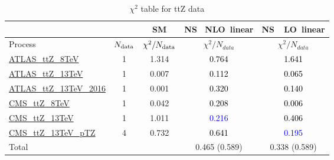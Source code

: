 \documentclass{article}
\begin{document}
\begin{table}[H]
\centering
\begin{tabular}{|l|c|c|c|c|}
\hline
 \multicolumn{2}{|c|}{} & SM& \rm NS \ NLO\ linear& \rm NS\ \ LO\ linear\\ \hline
Process & $N_{\rm data}$ & $\chi^ 2/N_{\rm data}$& $\chi^ 2/N_{data}$& $\chi^ 2/N_{data}$\\ \hline
\href{https://arxiv.org/abs/1509.05276}{ATLAS_ttZ_8TeV} & 1 & 1.314 & \textcolor{black}                            {0.764} & \textcolor{black}                            {1.641} \\ \hline
\href{https://arxiv.org/abs/1609.01599}{ATLAS_ttZ_13TeV} & 1 & 0.007 & \textcolor{black}                            {0.112} & \textcolor{black}                            {0.065} \\ \hline
\href{https://arxiv.org/abs/1901.03584}{ATLAS_ttZ_13TeV_2016} & 1 & 0.001 & \textcolor{black}                            {0.320} & \textcolor{black}                            {0.140} \\ \hline
\href{https://arxiv.org/abs/1510.01131}{CMS_ttZ_8TeV} & 1 & 0.042 & \textcolor{black}                            {0.208} & \textcolor{black}                            {0.006} \\ \hline
\href{https://arxiv.org/abs/1711.02547}{CMS_ttZ_13TeV} & 1 & 1.011 & \textcolor{blue}                            {0.216} & \textcolor{black}                            {0.406} \\ \hline
\href{https://arxiv.org/abs/1907.11270}{CMS_ttZ_13TeV_pTZ} & 4 & 0.732 & \textcolor{black}                            {0.641} & \textcolor{blue}                            {0.195} \\ \hline
\hline Total & &  & 0.465 (0.589) & 0.338 (0.589) \\ \hline
\end{tabular}
\caption{$\chi^2$ table for ttZ data}
\end{table}
\end{document}
